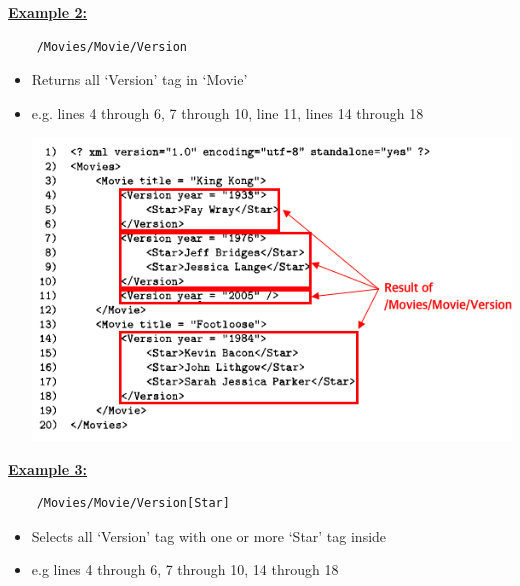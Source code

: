\documentclass[12pt]{article}
\begin{document}
\begin{enumerate}[1.]
\begin{enumerate}[a)]
\begin{itemize}
\begin{itemize}
                \bigskip

                \underline{\textbf{Example 2:}}


    \begin{lstlisting}
    /Movies/Movie/Version
    \end{lstlisting}

                \bigskip

                \begin{itemize}
                    \item Returns all `Version' tag in `Movie'
                    \item e.g. lines 4 through 6, 7 through 10, line 11, lines 14 through 18

                    \bigskip

                    \begin{center}
                    \includegraphics[width=\linewidth]{images/worksheet_10_4.png}
                    \end{center}
                \end{itemize}

                \bigskip

                \underline{\textbf{Example 3:}}


    \begin{lstlisting}
    /Movies/Movie/Version[Star]
    \end{lstlisting}

                \bigskip

                \begin{itemize}
                    \item Selects all `Version' tag with one or more `Star' tag inside
                    \item e.g lines 4 through 6, 7 through 10, 14 through 18


\end{itemize}
\end{itemize}
\end{itemize}
\end{enumerate}
\end{enumerate}
\end{document}
